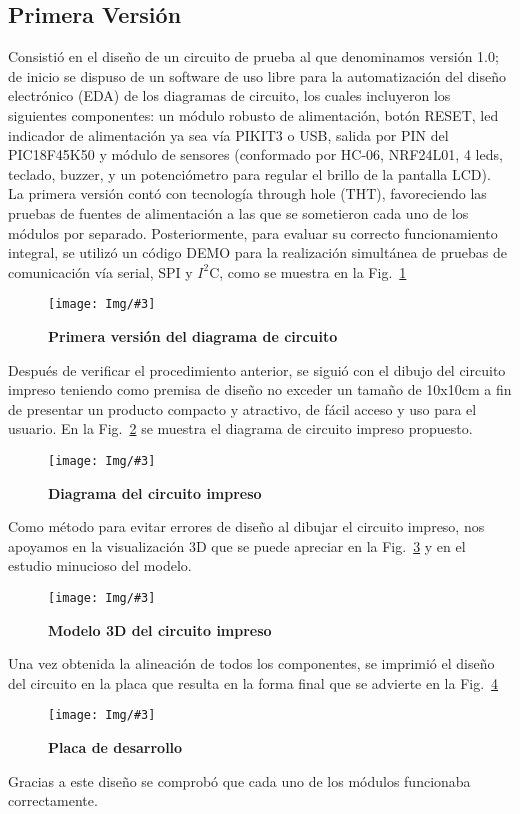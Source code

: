 \documentclass[times, 10pt,twocolumn]{article}
\newcommand{\Img}[5]{
   \begin{figure}[H]
   	   \centering
       \texttt{[image: Img/\#3]}
       \caption{ \centering \textbf{\small #4}}
       \label{#5}
       \end{figure}
   }
\begin{document}
\subsection{Primera Versión}
Consistió en el diseño de un circuito de prueba al que denominamos versión 1.0; de inicio se dispuso de un software de uso libre para la automatización del diseño electrónico (EDA) de los diagramas de circuito, los cuales incluyeron los siguientes componentes: un módulo robusto de alimentación, botón RESET, led indicador de alimentación ya sea vía PIKIT3 o USB, salida por PIN del PIC18F45K50 y módulo de sensores (conformado por HC-06, NRF24L01, 4 leds, teclado, buzzer, y un potenciómetro para regular el brillo de la pantalla LCD). \\
La primera versión contó con tecnología through hole (THT), favoreciendo las pruebas de fuentes de alimentación a las que se sometieron cada uno de los módulos por separado. Posteriormente, para evaluar su correcto funcionamiento integral, se utilizó un
código DEMO para la realización simultánea de pruebas de comunicación vía serial, SPI y $I^{2}$C, como se muestra en la Fig.~\ref{fig:1}

\Img{8.5cm}{6.3cm}{Primera_Version.pdf}{ Primera versión del diagrama de
circuito}{fig:1} Después de verificar el procedimiento anterior, se siguió con el dibujo del circuito impreso teniendo como premisa de diseño no exceder un tamaño de 10x10cm a fin de presentar un producto compacto y atractivo, de fácil acceso y uso para el usuario.
En la Fig.~\ref{fig:2} se muestra el diagrama de circuito impreso propuesto.
\Img{6.5cm}{6.0cm}{primera_version_pcb}{Diagrama del circuito impreso}{fig:2}
Como método para evitar errores de diseño al dibujar el circuito impreso, nos apoyamos en la visualización 3D que se puede apreciar en la Fig.~\ref{fig:3} y en el estudio minucioso del modelo.
\Img{8.5cm}{7.0cm}{primera_version_3d}{Modelo 3D del circuito
impreso}{fig:3}
Una vez obtenida la alineación de todos los componentes, se imprimió el diseño del circuito en la placa que resulta en la forma final que se advierte en la Fig.~\ref{fig:4}
\Img{8.5cm}{7.0cm}{primera_version_final}{Placa de desarrollo}{fig:4} 
Gracias a este diseño se comprobó que cada uno de los módulos funcionaba correctamente. 


\end{document}
